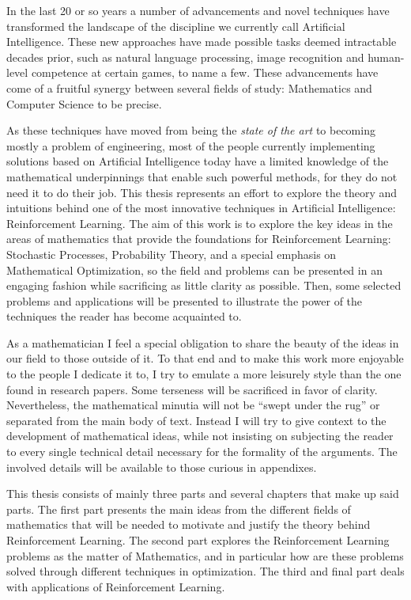 In the last 20 or so years a number of advancements and novel 
techniques have transformed the landscape of the discipline we 
currently call Artificial Intelligence. These new approaches have made 
possible tasks deemed intractable decades prior, such as natural 
language processing, image recognition and human-level 
competence at certain games, to name a few.  These advancements 
have come of a fruitful synergy between several fields of study: 
Mathematics and Computer Science to be precise.

As these techniques have moved from being the \textit{state of the 
art} to becoming mostly a problem of engineering, most of the people 
currently implementing solutions based on Artificial 
Intelligence today have a limited knowledge of the mathematical 
underpinnings that enable such powerful methods, for they do not 
need it to do their job.  This thesis represents an effort to 
explore the theory and intuitions behind one of the most 
innovative techniques in Artificial Intelligence: Reinforcement 
Learning.  The aim of this work is to explore the key ideas in 
the areas of mathematics that provide the foundations for 
Reinforcement Learning: Stochastic Processes, Probability 
Theory, and a special emphasis on Mathematical Optimization, so 
the field and problems can be presented in an engaging fashion 
while sacrificing as little clarity as possible.  Then, some 
selected problems and applications will be presented to 
illustrate the power of the techniques the reader has become 
acquainted to. 

As a mathematician I feel a special obligation to share the beauty of 
the ideas in our field to those outside of it. To that end and to make 
this work more enjoyable to the people I dedicate it to, I try to 
emulate a more leisurely style than the one found in research papers.  
Some terseness will be sacrificed in favor of clarity. Nevertheless, 
the mathematical minutia will not be ``swept under the rug'' or 
separated from the main body of text. Instead I will try to give 
context to the development of mathematical ideas, while not insisting 
on subjecting the reader to every single technical detail necessary 
for the formality of the arguments. The involved details will be 
available to those curious in appendixes.

This thesis consists of mainly three parts and several chapters that 
make up said parts. The first part presents the main ideas from the 
different fields of mathematics that will be needed to motivate and 
justify the theory behind Reinforcement Learning. The second part 
explores the Reinforcement Learning problems as the matter of 
Mathematics, and in particular how are these problems solved through 
different techniques in optimization. The third and final part deals 
with applications of Reinforcement Learning.

